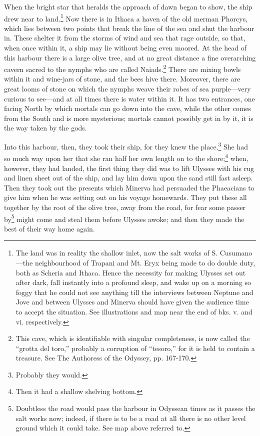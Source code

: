 When the bright star that heralds the approach of dawn began to show, the ship
drew near to land.\footnote{The land was in reality the shallow inlet, now the salt works of S.
Cusumano—the neighbourhood of Trapani and Mt. Eryx being made to do double
duty, both as Scheria and Ithaca. Hence the necessity for making Ulysses set
out after dark, fall instantly into a profound sleep, and wake up on a morning
so foggy that he could not see anything till the interviews between Neptune
and Jove and between Ulysses and Minerva should have given the audience time
to accept the situation. See illustrations and map near the end of bks. v. and
vi. respectively.} Now there is in Ithaca a haven of
the old merman Phorcys, which lies between two points that break the line of
the sea and shut the harbour in. These shelter it from the storms of wind and
sea that rage outside, so that, when once within it, a ship may lie without
being even moored. At the head of this harbour there is a large olive tree, and
at no great distance a fine overarching cavern sacred to the nymphs who are
called Naiads.\footnote{This cave, which is identifiable with singular completeness, is now called
the “grotta del toro,” probably a corruption of “tesoro,” for it is held to
contain a treasure. See The Authoress of the Odyssey, pp. 167-170.} There are mixing bowls within it
and wine-jars of stone, and the bees hive there. Moreover, there are great
looms of stone on which the nymphs weave their robes of sea purple—very curious
to see—and at all times there is water within it. It has two entrances, one
facing North by which mortals can go down into the cave, while the other comes
from the South and is more mysterious; mortals cannot possibly get in by it, it
is the way taken by the gods.

Into this harbour, then, they took their ship, for they knew the place.\footnote{Probably they would.} She had so
much way upon her that she ran half her own length on to the shore;\footnote{Then it had a shallow shelving bottom.} when, however,
they had landed, the first thing they did was to lift Ulysses with his rug and
linen sheet out of the ship, and lay him down upon the sand still fast asleep.
Then they took out the presents which Minerva had persuaded the Phaeacians to
give him when he was setting out on his voyage homewards. They put these all
together by the root of the olive tree, away from the road, for fear some
passer by\footnote{Doubtless the road would pass the harbour in Odyssean times as it passes the
salt works now; indeed, if there is to be a road at all there is no other
level ground which it could take. See map above referred to.}
might come and steal them before Ulysses awoke; and then they made the best of
their way home again.

